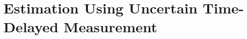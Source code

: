 \section{Estimation Using Uncertain Time-Delayed Measurement} \label{sect:estimation_delayed_msr}	
	
	
%		



\clearpage

%

\clearpage




